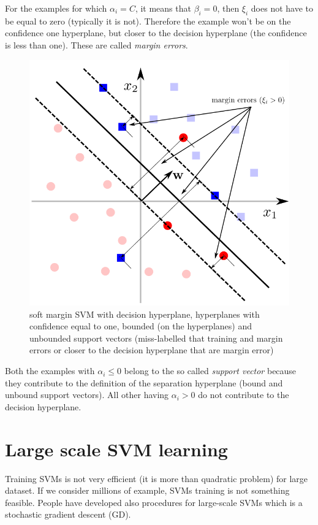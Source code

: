 For the examples for which $\alpha_{i}= C$, it means that $\beta_{i}= 0$, then $\xi
_{i}$ does not have to be equal to zero (typically it is not). Therefore the
example won't be on the confidence one hyperplane, but closer to the decision hyperplane
(the confidence is less than one). These are called \textit{margin errors}.\\
\begin{figure}[H]
	\centering
	\includegraphics[scale=0.35]{
        images/13_SupportVectorMachines_softSVM.png
    }
	\caption{soft margin SVM with decision hyperplane, hyperplanes with confidence
	equal to one, bounded (on the hyperplanes) and unbounded support vectors (miss-labelled
	that training and margin errors or closer to the decision hyperplane that are margin
	error)}
	\label{fig:SVM_soft}
\end{figure}

Both the examples with $\alpha_{i}\leq 0$ belong to the so called \textit{support
vector} because they contribute to the definition of the separation hyperplane (bound
and unbound support vectors). All other having $\alpha_{i}> 0$ do not contribute
to the decision hyperplane.

\section{Large scale SVM learning}
Training SVMs is not very efficient (it is more than quadratic problem) for
large dataset. If we consider millions of example, SVMs training is not
something feasible. People have developed also procedures for large-scale SVMs which
is a stochastic gradient descent (GD).\\

